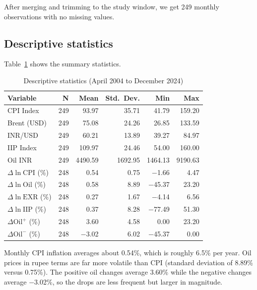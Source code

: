 \documentclass[12pt,a4paper]{article}
\begin{document}
After merging and trimming to the study window, we get 249 monthly observations with no missing values.

\subsection{Descriptive statistics}

Table~\ref{tab:descstats} shows the summary statistics.

\begin{table}[H]
\centering
\caption{Descriptive statistics (April 2004 to December 2024)}
\label{tab:descstats}
\small
\begin{tabular}{lrrrrr}
\toprule
\textbf{Variable} & \textbf{N} & \textbf{Mean} & \textbf{Std.\ Dev.} & \textbf{Min} & \textbf{Max} \\
\midrule
CPI Index                        & 249 & 93.97  & 35.71  & 41.79   & 159.20 \\
Brent (USD)                      & 249 & 75.08  & 24.26  & 26.85   & 133.59 \\
INR/USD                          & 249 & 60.21  & 13.89  & 39.27   & 84.97  \\
IIP Index                        & 249 & 109.97 & 24.46  & 54.00   & 160.00 \\
Oil INR                          & 249 & 4490.59& 1692.95& 1464.13 & 9190.63\\
\midrule
$\Delta\ln\text{CPI}$ (\%)      & 248 & 0.54  & 0.75  & $-$1.66 & 4.47 \\
$\Delta\ln\text{Oil}$ (\%)      & 248 & 0.58  & 8.89  & $-$45.37& 23.20\\
$\Delta\ln\text{EXR}$ (\%)      & 248 & 0.27  & 1.67  & $-$4.14 & 6.56 \\
$\Delta\ln\text{IIP}$ (\%)      & 248 & 0.37  & 8.28  & $-$77.49& 51.30\\
$\Delta\text{Oil}^{+}$ (\%)     & 248 & 3.60  & 4.58  & 0.00    & 23.20\\
$\Delta\text{Oil}^{-}$ (\%)     & 248 & $-$3.02& 6.02  & $-$45.37& 0.00 \\
\bottomrule
\end{tabular}
\end{table}

Monthly CPI inflation averages about 0.54\%, which is roughly 6.5\% per year. Oil prices in rupee terms are far more volatile than CPI (standard deviation of 8.89\% versus 0.75\%). The positive oil changes average 3.60\% while the negative changes average $-$3.02\%, so the drops are less frequent but larger in magnitude.
\end{document}
